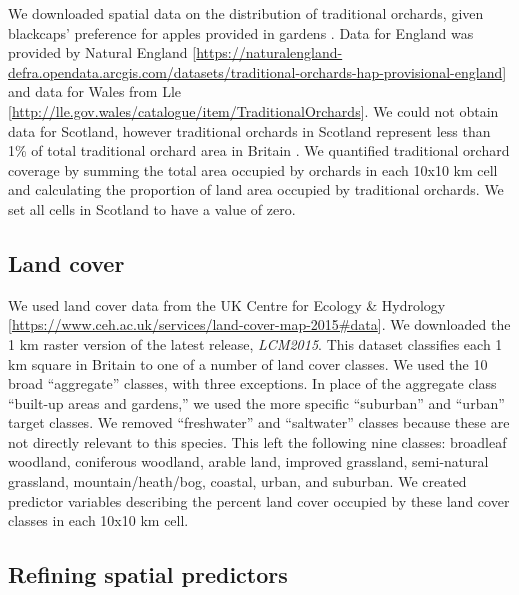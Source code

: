 \documentclass[a4paper, nobind]{templates/ociamthesis}
\begin{document}
We downloaded spatial data on the distribution of traditional orchards, given blackcaps' preference for apples provided in gardens \autocite{hardyWinterFoodsBlackcaps1978,leachWinteringBlackcapsBritain1981}. Data for England was provided by Natural England {[}\url{https://naturalengland-defra.opendata.arcgis.com/datasets/traditional-orchards-hap-provisional-england}{]} and data for Wales from Lle {[}\url{http://lle.gov.wales/catalogue/item/TraditionalOrchards}{]}. We could not obtain data for Scotland, however traditional orchards in Scotland represent less than 1\% of total traditional orchard area in Britain \autocite{brigUKBiodiversityAction2008}. We quantified traditional orchard coverage by summing the total area occupied by orchards in each 10x10 km cell and calculating the proportion of land area occupied by traditional orchards. We set all cells in Scotland to have a value of zero.

\hypertarget{land-cover}{%
\subsection{Land cover}\label{land-cover}}

We used land cover data from the UK Centre for Ecology \& Hydrology {[}\url{https://www.ceh.ac.uk/services/land-cover-map-2015\#data}{]}. We downloaded the 1 km raster version of the latest release, \emph{LCM2015}. This dataset classifies each 1 km square in Britain to one of a number of land cover classes. We used the 10 broad ``aggregate'' classes, with three exceptions. In place of the aggregate class ``built-up areas and gardens,'' we used the more specific ``suburban'' and ``urban'' target classes. We removed ``freshwater'' and ``saltwater'' classes because these are not directly relevant to this species. This left the following nine classes: broadleaf woodland, coniferous woodland, arable land, improved grassland, semi-natural grassland, mountain/heath/bog, coastal, urban, and suburban. We created predictor variables describing the percent land cover occupied by these land cover classes in each 10x10 km cell.

\hypertarget{refining-spatial-predictors}{%
\subsection{Refining spatial predictors}\label{refining-spatial-predictors}}
\end{document}
